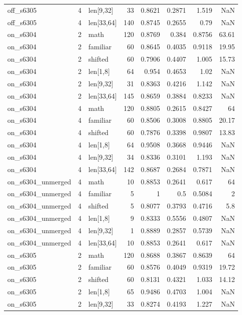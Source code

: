 \begin{table}
\begin{tabular}{lrlrrrrr}
off\_s6305 & 4 & len[9,32] & 33 & 0.8621 & 0.2871 & 1.519 & NaN \\
off\_s6305 & 4 & len[33,64] & 140 & 0.8745 & 0.2655 & 0.79 & NaN \\
on\_s6304 & 2 & math & 120 & 0.8769 & 0.384 & 0.8756 & 63.61 \\
on\_s6304 & 2 & familiar & 60 & 0.8645 & 0.4035 & 0.9118 & 19.95 \\
on\_s6304 & 2 & shifted & 60 & 0.7906 & 0.4407 & 1.005 & 15.73 \\
on\_s6304 & 2 & len[1,8] & 64 & 0.954 & 0.4653 & 1.02 & NaN \\
on\_s6304 & 2 & len[9,32] & 31 & 0.8363 & 0.4216 & 1.142 & NaN \\
on\_s6304 & 2 & len[33,64] & 145 & 0.8659 & 0.3884 & 0.8233 & NaN \\
on\_s6304 & 4 & math & 120 & 0.8805 & 0.2615 & 0.8427 & 64 \\
on\_s6304 & 4 & familiar & 60 & 0.8506 & 0.3008 & 0.8805 & 20.17 \\
on\_s6304 & 4 & shifted & 60 & 0.7876 & 0.3398 & 0.9807 & 13.83 \\
on\_s6304 & 4 & len[1,8] & 64 & 0.9508 & 0.3668 & 0.9446 & NaN \\
on\_s6304 & 4 & len[9,32] & 34 & 0.8336 & 0.3101 & 1.193 & NaN \\
on\_s6304 & 4 & len[33,64] & 142 & 0.8687 & 0.2684 & 0.7871 & NaN \\
on\_s6304\_unmerged & 4 & math & 10 & 0.8853 & 0.2641 & 0.617 & 64 \\
on\_s6304\_unmerged & 4 & familiar & 5 & 1 & 0.5 & 0.5084 & 2 \\
on\_s6304\_unmerged & 4 & shifted & 5 & 0.8077 & 0.3793 & 0.4716 & 5.8 \\
on\_s6304\_unmerged & 4 & len[1,8] & 9 & 0.8333 & 0.5556 & 0.4807 & NaN \\
on\_s6304\_unmerged & 4 & len[9,32] & 1 & 0.8889 & 0.2857 & 0.5739 & NaN \\
on\_s6304\_unmerged & 4 & len[33,64] & 10 & 0.8853 & 0.2641 & 0.617 & NaN \\
on\_s6305 & 2 & math & 120 & 0.8688 & 0.3867 & 0.8639 & 64 \\
on\_s6305 & 2 & familiar & 60 & 0.8576 & 0.4049 & 0.9319 & 19.72 \\
on\_s6305 & 2 & shifted & 60 & 0.8131 & 0.4321 & 1.033 & 14.12 \\
on\_s6305 & 2 & len[1,8] & 65 & 0.9486 & 0.4703 & 1.004 & NaN \\
on\_s6305 & 2 & len[9,32] & 33 & 0.8274 & 0.4193 & 1.227 & NaN \\

\end{tabular}
\end{table}
